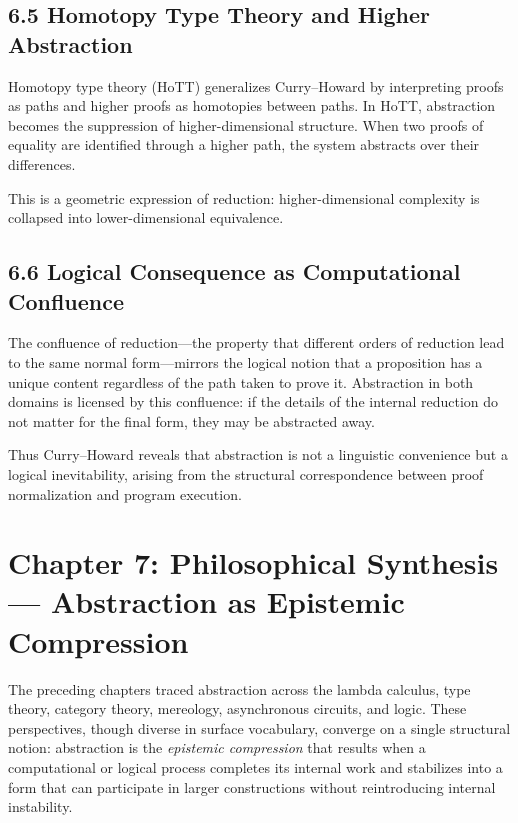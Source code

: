\documentclass[11pt,letterpaper]{article}
\begin{document}
\subsection{6.5 Homotopy Type Theory and Higher Abstraction}

Homotopy type theory (HoTT) generalizes Curry--Howard by interpreting proofs as paths and higher proofs as homotopies between paths. In HoTT, abstraction becomes the suppression of higher-dimensional structure. When two proofs of equality are identified through a higher path, the system abstracts over their differences.

This is a geometric expression of reduction: higher-dimensional complexity is collapsed into lower-dimensional equivalence.

\subsection{6.6 Logical Consequence as Computational Confluence}

The confluence of reduction—the property that different orders of reduction lead to the same normal form—mirrors the logical notion that a proposition has a unique content regardless of the path taken to prove it. Abstraction in both domains is licensed by this confluence: if the details of the internal reduction do not matter for the final form, they may be abstracted away.

Thus Curry--Howard reveals that abstraction is not a linguistic convenience but a logical inevitability, arising from the structural correspondence between proof normalization and program execution.

\newpage

\section{Chapter 7: Philosophical Synthesis — Abstraction as Epistemic Compression}

The preceding chapters traced abstraction across the lambda calculus, type theory, category theory, mereology, asynchronous circuits, and logic. These perspectives, though diverse in surface vocabulary, converge on a single structural notion: abstraction is the \emph{epistemic compression} that results when a computational or logical process completes its internal work and stabilizes into a form that can participate in larger constructions without reintroducing internal instability.
\end{document}
